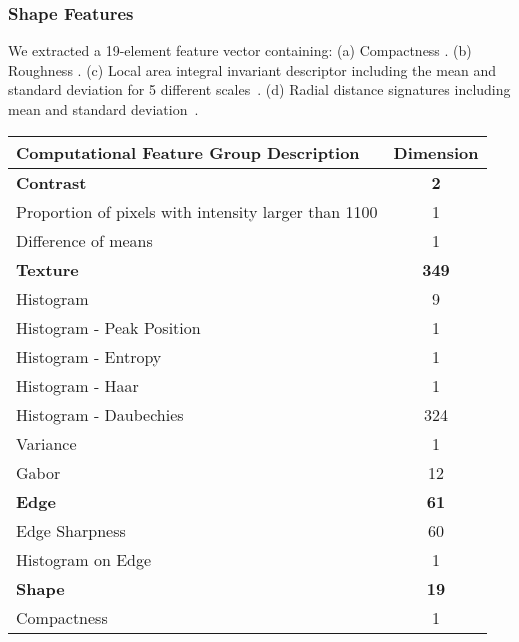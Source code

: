 \subsubsection{Shape Features}
We extracted a 19-element feature vector containing: (a) Compactness \cite{Duda:1973ul}. (b) Roughness \cite{Kilday:1993jk}. (c) Local area integral invariant descriptor including the mean and standard deviation for 5 different scales~\cite{Hong:2006ti,Manay:2006un}. (d) Radial distance signatures including mean and standard deviation~\cite{MRangayyan:2005td}.

\begin{table}
	\centering
	\begin{tabular}{|l|c|}
		\hline
		Computational Feature Group Description & Dimension \\ \hline \hline
		\textbf{Contrast} & \textbf{2} \\ \hline
		\hspace{2pt} Proportion of pixels with intensity larger than 1100 & 1 \\ \hline
		\hspace{2pt} Difference of means & 1 \\ \hline
		\textbf{Texture} & \textbf{349} \\ \hline
		\hspace{2pt} Histogram & 9 \\ \hline
		\hspace{2pt} Histogram - Peak Position & 1 \\ \hline
		\hspace{2pt} Histogram - Entropy & 1 \\ \hline
		\hspace{2pt} Histogram - Haar & 1 \\ \hline
		\hspace{2pt} Histogram - Daubechies & 324 \\ \hline
		\hspace{2pt} Variance & 1 \\ \hline
		\hspace{2pt} Gabor & 12 \\ \hline
		\textbf{Edge} & \textbf{61} \\ \hline
		\hspace{2pt} Edge Sharpness & 60 \\ \hline
		\hspace{2pt} Histogram on Edge & 1 \\ \hline
		\textbf{Shape} & \textbf{19} \\ \hline
		\hspace{2pt} Compactness & 1 \\ \hline

\end{tabular}
\end{table}

